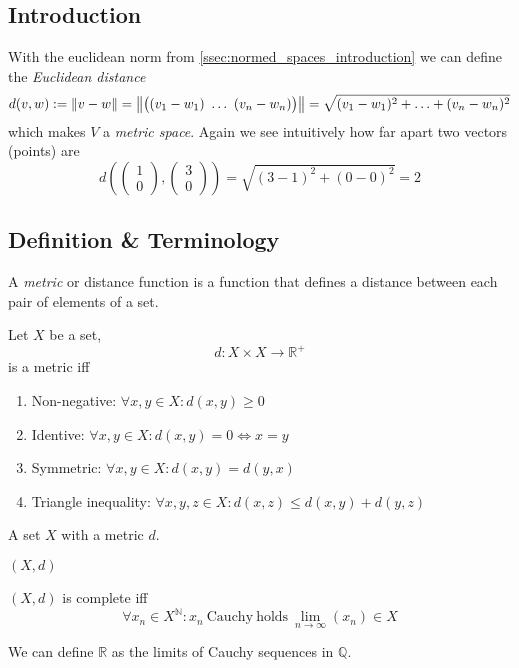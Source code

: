 \subsection{Introduction}
With the euclidean norm from \cref{ssec:normed_spaces_introduction} we can define the \emph{Euclidean distance}
\[d(v, w) := \left\lVert v - w\right\rVert = \left\lVert\big((v_1 - w_1)~\ldots~(v_n - w_n)\big)\right\rVert = \sqrt{(v_1 - w_1)^2 + \ldots + (v_n - w_n)^2}\]
which makes \(V\) a \emph{metric space}.
Again we see intuitively how far apart two vectors (points) are
\[d\left(\begin{pmatrix}1\\0\end{pmatrix}, \begin{pmatrix}3\\0\end{pmatrix}\right) = \sqrt{(3 - 1)^2 + (0 - 0)^2} = 2\]

\subsection{Definition \& Terminology}
A \emph{metric} or distance function is a function that defines a distance between each pair of elements of a set.
\begin{definition}[Metric]
   Let \(X\) be a set,
   \[d: X \times X \to \mathbb{R}^+\]
   is a metric iff
   \begin{enumerate}[label=\roman*, align=Center]
      \item Non-negative: \(\forall x, y \in X: d(x,y) \geq 0\)
      \item Identive: \(\forall x, y \in X: d(x, y) = 0 \iff x = y\)
      \item Symmetric: \(\forall x, y \in X: d(x, y) = d(y, x)\)
      \item Triangle inequality: \(\forall x, y, z \in X: d(x, z) \leq d(x, y) + d(y, z)\)
   \end{enumerate}
\end{definition}

\begin{definition}
   A set \(X\) with a metric \(d\).
\end{definition}
\begin{remark}[Notation]
   \((X, d)\)
\end{remark}

\begin{definition}
   \((X, d)\) is complete iff
   \[\forall x_n \in X^\mathbb{N}: x_n~\text{Cauchy}~\text{holds}~\lim_{n\to\infty}(x_n) \in X\]
\end{definition}
\begin{remark}[Intuition]
   We can define \(\mathbb{R}\) as the limits of Cauchy sequences in \(\mathbb{Q}\).
\end{remark}

